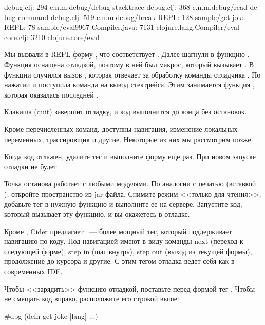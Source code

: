 \begin{english}
  \begin{text/lines}
    debug.clj:  294  c.n.m.debug/debug-stacktrace
    debug.clj:  368  c.n.m.debug/read-debug-command
    debug.clj:  519  c.n.m.debug/break
         REPL:  128  sample/get-joke
         REPL:   78  sample/eval9967
Compiler.java: 7131  clojure.lang.Compiler/eval
     core.clj: 3210  clojure.core/eval
  \end{text/lines}
\end{english}

Мы вызвали в REPL форму , что соответствует  . Далее шагнули в функцию  . Функция оснащена отладкой, поэтому в ней был макрос, который вызывает . В функции  случился вызов , которая отвечает за обработку команды отладчика . По нажатии  и поступила команда на вывод стектрейса. Этим занимается функция , которая оказалась последней .

Клавиша  (quit) завершит отладку, и код выполнится до конца без остановок.

Кроме перечисленных команд, доступны навигация, изменение локальных переменных, трассировщик и другие. Некоторые из них мы рассмотрим позже.

Когда код отлажен, удалите тег  и выполните форму еще раз. При новом запуске отладки не будет.

Точка останова работает с любыми модулями. По аналогии с печатью (вставкой ), откройте пространство из jar-файла. Снимите режим <<только для чтения>>, добавьте тег  в нужную функцию и выполните ее на сервере. Запустите код, который вызывает эту функцию, и вы окажетесь в отладке.


Кроме , Cider предлагает ~--- более мощный тег, который поддерживает навигацию по коду. Под навигацией имеют в виду команды next (переход к следующей форме), step in (шаг внутрь), step out (выход из текущей формы), продолжение до курсора и другие. С этим тегом отладка ведет себя как в современных IDE.

Чтобы <<зарядить>> функцию отладкой, поставьте перед формой  тег . Чтобы не смещать код вправо, расположите его строкой выше:

\begin{english}
  \begin{clojure}
#dbg
(defn get-joke [lang]
  ...)
  \end{clojure}
\end{english}

